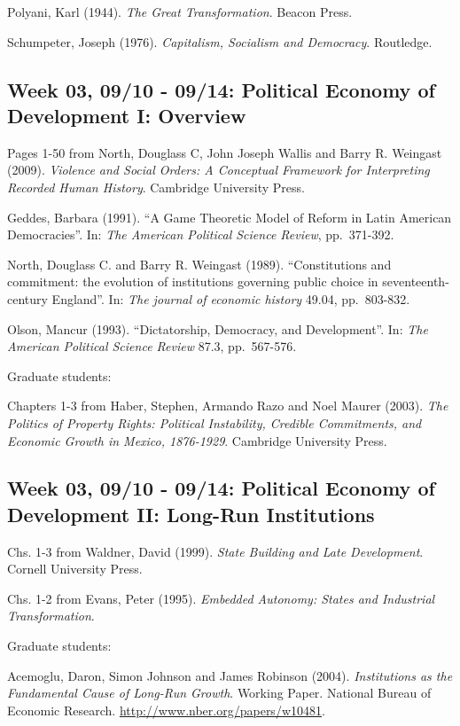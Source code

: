 \documentclass[11pt,]{article}
\begin{document}
Polyani, Karl (1944). \emph{The Great Transformation}. Beacon Press.

Schumpeter, Joseph (1976). \emph{Capitalism, Socialism and Democracy}.
Routledge.

\subsection{Week 03, 09/10 - 09/14: Political Economy of Development I:
Overview}\label{week-03-0910---0914-political-economy-of-development-i-overview}

Pages 1-50 from North, Douglass C, John Joseph Wallis and Barry R.
Weingast (2009).
\emph{Violence and Social Orders: A Conceptual Framework for Interpreting Recorded Human History}.
Cambridge University Press.

Geddes, Barbara (1991). ``A Game Theoretic Model of Reform in Latin
American Democracies''. In:
\emph{The American Political Science Review}, pp.~371-392.

North, Douglass C. and Barry R. Weingast (1989). ``Constitutions and
commitment: the evolution of institutions governing public choice in
seventeenth-century England''. In:
\emph{The journal of economic history} 49.04, pp.~803-832.

Olson, Mancur (1993). ``Dictatorship, Democracy, and Development''. In:
\emph{The American Political Science Review} 87.3, pp.~567-576.

Graduate students:

Chapters 1-3 from Haber, Stephen, Armando Razo and Noel Maurer (2003).
\emph{The Politics of Property Rights: Political Instability, Credible Commitments, and Economic Growth in Mexico, 1876-1929}.
Cambridge University Press.

\subsection{Week 03, 09/10 - 09/14: Political Economy of Development II:
Long-Run
Institutions}\label{week-03-0910---0914-political-economy-of-development-ii-long-run-institutions}

Chs. 1-3 from Waldner, David (1999).
\emph{State Building and Late Development}. Cornell University Press.

Chs. 1-2 from Evans, Peter (1995).
\emph{Embedded Autonomy: States and Industrial Transformation}.

Graduate students:

Acemoglu, Daron, Simon Johnson and James Robinson (2004).
\emph{Institutions as the Fundamental Cause of Long-Run Growth}. Working
Paper. National Bureau of Economic Research.
\url{http://www.nber.org/papers/w10481}.
\end{document}
